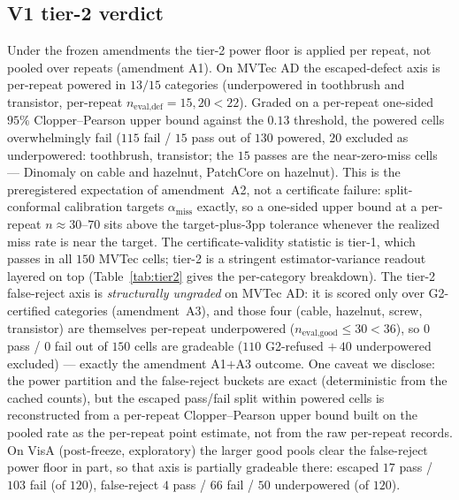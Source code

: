 \documentclass[11pt]{article}
\begin{document}
\subsection{V1 tier-2 verdict}
\label{sec:tier2verdict}

Under the frozen amendments the tier-2 power floor is applied per repeat, not pooled over repeats
(amendment A1). On MVTec AD the escaped-defect axis is per-repeat powered in $13/15$ categories
(underpowered in toothbrush and transistor, per-repeat $n_{\text{eval,def}}=15,20<22$). Graded on a
per-repeat one-sided $95\%$ Clopper--Pearson upper bound against the $0.13$ threshold, the powered
cells overwhelmingly fail ($115$ fail / $15$ pass out of $130$ powered, $20$ excluded as
underpowered: toothbrush, transistor; the $15$ passes are the near-zero-miss cells --- Dinomaly on
cable and hazelnut, PatchCore on hazelnut). This is the preregistered expectation of amendment~A2,
not a certificate failure: split-conformal calibration targets $\alpha_{\text{miss}}$ exactly, so a
one-sided upper bound at a per-repeat $n\approx30$--$70$ sits above the target-plus-$3$pp tolerance
whenever the realized miss rate is near the target. The certificate-validity statistic is tier-1,
which passes in all $150$ MVTec cells; tier-2 is a stringent estimator-variance readout layered on
top (Table~\ref{tab:tier2} gives the per-category breakdown). The tier-2 false-reject axis is
\emph{structurally ungraded} on
MVTec AD: it is scored only over G2-certified categories (amendment~A3), and those four (cable,
hazelnut, screw, transistor) are themselves per-repeat underpowered ($n_{\text{eval,good}}\le30<36$),
so $0$ pass / $0$ fail out of $150$ cells are gradeable ($110$ G2-refused $+\,40$ underpowered
excluded) --- exactly the amendment A1$+$A3 outcome. One caveat we disclose: the
power partition and the false-reject buckets are exact (deterministic from the cached counts), but
the escaped pass/fail split within powered cells is reconstructed from a per-repeat Clopper--Pearson
upper bound built on the pooled rate as the per-repeat point estimate, not from the raw per-repeat
records. On VisA (post-freeze, exploratory) the larger good pools clear the false-reject power floor
in part, so that axis is partially gradeable there: escaped $17$ pass / $103$ fail (of $120$), false-reject
$4$ pass / $66$ fail / $50$ underpowered (of $120$).
\end{document}
